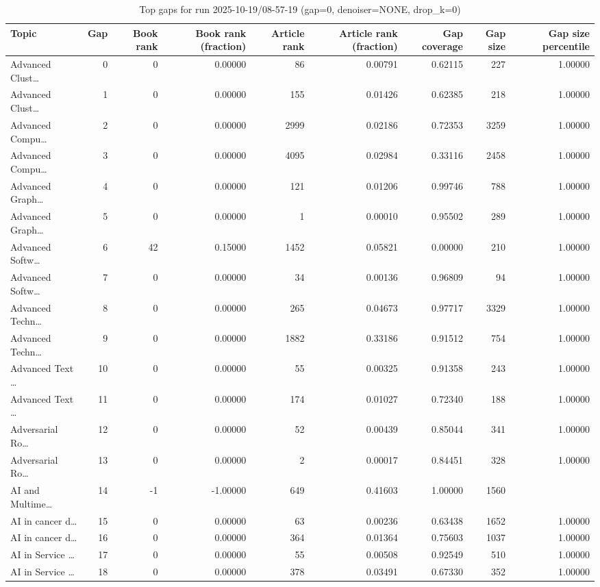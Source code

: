 \begin{table}
\caption{Top gaps for run 2025-10-19/08-57-19 (gap=0, denoiser=NONE, drop\_k=0)}
\label{tab:best_run_gap0_2025_10_19_08_57_19}
\begin{tabular}{lrrrrrrrr}
\toprule
Topic & Gap & Book rank & Book rank (fraction) & Article rank & Article rank (fraction) & Gap coverage & Gap size & Gap size percentile \\
\midrule
Advanced Clust… & 0 & 0 & 0.00000 & 86 & 0.00791 & 0.62115 & 227 & 1.00000 \\
Advanced Clust… & 1 & 0 & 0.00000 & 155 & 0.01426 & 0.62385 & 218 & 1.00000 \\
Advanced Compu… & 2 & 0 & 0.00000 & 2999 & 0.02186 & 0.72353 & 3259 & 1.00000 \\
Advanced Compu… & 3 & 0 & 0.00000 & 4095 & 0.02984 & 0.33116 & 2458 & 1.00000 \\
Advanced Graph… & 4 & 0 & 0.00000 & 121 & 0.01206 & 0.99746 & 788 & 1.00000 \\
Advanced Graph… & 5 & 0 & 0.00000 & 1 & 0.00010 & 0.95502 & 289 & 1.00000 \\
Advanced Softw… & 6 & 42 & 0.15000 & 1452 & 0.05821 & 0.00000 & 210 & 1.00000 \\
Advanced Softw… & 7 & 0 & 0.00000 & 34 & 0.00136 & 0.96809 & 94 & 1.00000 \\
Advanced Techn… & 8 & 0 & 0.00000 & 265 & 0.04673 & 0.97717 & 3329 & 1.00000 \\
Advanced Techn… & 9 & 0 & 0.00000 & 1882 & 0.33186 & 0.91512 & 754 & 1.00000 \\
Advanced Text … & 10 & 0 & 0.00000 & 55 & 0.00325 & 0.91358 & 243 & 1.00000 \\
Advanced Text … & 11 & 0 & 0.00000 & 174 & 0.01027 & 0.72340 & 188 & 1.00000 \\
Adversarial Ro… & 12 & 0 & 0.00000 & 52 & 0.00439 & 0.85044 & 341 & 1.00000 \\
Adversarial Ro… & 13 & 0 & 0.00000 & 2 & 0.00017 & 0.84451 & 328 & 1.00000 \\
AI and Multime… & 14 & -1 & -1.00000 & 649 & 0.41603 & 1.00000 & 1560 &  \\
AI in cancer d… & 15 & 0 & 0.00000 & 63 & 0.00236 & 0.63438 & 1652 & 1.00000 \\
AI in cancer d… & 16 & 0 & 0.00000 & 364 & 0.01364 & 0.75603 & 1037 & 1.00000 \\
AI in Service … & 17 & 0 & 0.00000 & 55 & 0.00508 & 0.92549 & 510 & 1.00000 \\
AI in Service … & 18 & 0 & 0.00000 & 378 & 0.03491 & 0.67330 & 352 & 1.00000 \\

\end{tabular}
\end{table}
